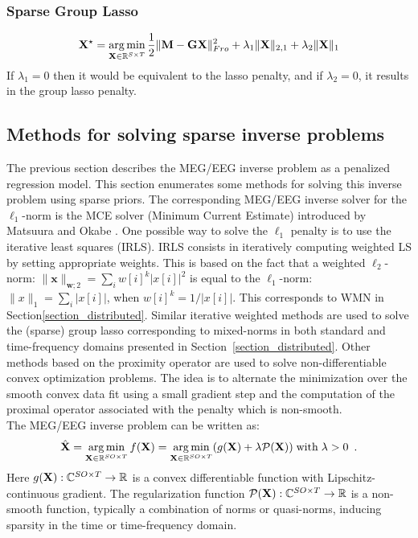 \subsubsection*{Sparse Group Lasso}
\begin{equation} \label{eq_sglasso}
	\mathbf{X}^\star = \mathop{\mathrm{arg}\,\mathrm{min}}_{\mathbf{X}\in\mathbb{R}^{S\times T}}\frac{1}{2}\|\mathbf{M}-\mathbf{GX}\|_{Fro}^2 + \lambda_1\|\mathbf{X}\|_{2,1} + \lambda_2\|\mathbf{X}\|_1
\end{equation}
If $\lambda_1=0$ then it would be equivalent to the lasso penalty, and if $\lambda_2=0$, it results in the group lasso penalty.
\endadjustwidth

\subsection{Methods for solving sparse inverse problems}
The previous section describes the MEG/EEG inverse problem as a penalized regression model. This section enumerates some methods for solving this inverse problem using sparse priors. The corresponding MEG/EEG inverse solver for the $\ell_1$-norm is the MCE solver (Minimum Current Estimate) introduced by Matsuura and Okabe \cite{matsuura1995selective}. One possible way to solve the $\ell_1$ penalty is to use the iterative least squares (IRLS). IRLS consists in iteratively computing weighted LS by setting appropriate weights. This is based on the fact that a weighted $\ell_2$-norm: $\|\mathbf{x}\|_{\mathbf{w};2}=\sum_i w[i]^k |x[i]|^2$ is equal to the $\ell_1$-norm: $\|x\|_1=\sum_i|x[i]|$, when $w[i]^k=1/|x[i]|$. This corresponds to WMN in Section\ref{section_distributed}. Similar iterative weighted methods are used to solve the (sparse) group lasso corresponding to mixed-norms in both standard and time-frequency domains presented in Section~\ref{section_distributed}. Other methods based on the proximity operator are used to solve non-differentiable convex optimization problems. The idea is to alternate the minimization over the smooth convex data fit using a small gradient step and the computation of the proximal operator associated with the penalty which is non-smooth.\\

The MEG/EEG inverse problem can be written as:
\begin{equation}
\hat{\mathbf{X}} = \mathop{\mathrm{arg}\,\mathrm{min}}_{\mathbf{X}\in\mathbb{R}^{SO\times T}}f(\mathbf{X}) = \mathop{\mathrm{arg}\,\mathrm{min}}_{\mathbf{X}\in\mathbb{R}^{SO\times T}}(g(\mathbf{X}) + \lambda\mathcal{P}(\mathbf{X})) \mathrm{\;with\;} \lambda>0 \enspace .
\end{equation}
Here $g(\mathbf{X}):\mathbb{C}^{SO\times T}\rightarrow\mathbb{R}$ is a convex differentiable function with Lipschitz-continuous gradient. The regularization function $\mathcal{P}(\mathbf{X}):\mathbb{C}^{SO\times T}\rightarrow\mathbb{R}$ is a non-smooth function, typically a combination of norms or quasi-norms, inducing sparsity in the time or time-frequency domain.

